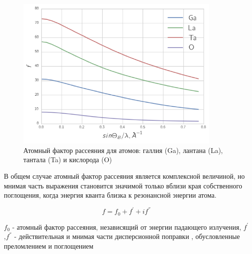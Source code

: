 \begin{figure}[h]
  \centering
  \includegraphics[width=0.9\textwidth]{images/atom_factor_GaLaTa.png}
  \caption{ Атомный фактор рассеяния для атомов: галлия (Ga), лантана (La), тантала (Ta) и  кислорода (O)}
  \label{ris:atom_factor_GaLaTa}
\end{figure}

В общем случае атомный фактор рассеяния является комплексной величиной,
но мнимая часть выражения становится значимой только вблизи края собственного
 поглощения, когда энергия кванта близка к резонансной энергии атома.

 \begin{equation}
   f = f_0 + f^{'} + i f^{''}
  \end{equation}

$f_0$ - атомный фактор рассеяния, независящий от энергии падающего излучения,
$f^{'}$,$f^{''}$ - действительная и мнимая части дисперсионной поправки \cite{f0f1f12},
 обусловленные преломлением и поглощением

 
